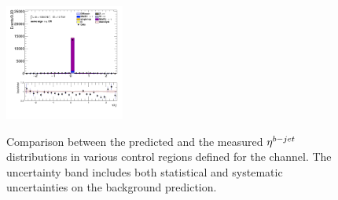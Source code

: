 \begin{figure}[!htp]
\begin{center}
			\includegraphics[width=0.35\textwidth]{chapters/chapter6_HPlus/images/taulep/bjet_0_eta_SS_TAUMU.png} \\
			\end{center}
			\caption{
			Comparison between the predicted and the measured $\eta^{b-jet}$ distributions in various control regions defined for the \taulep channel. The uncertainty band includes both statistical and systematic uncertainties on the background prediction. 
			}
			\label{fig:bkg-eta-bjet-taulep}
		\end{figure}

